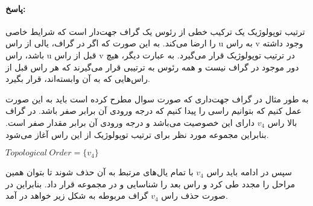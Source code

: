 \documentclass[a4paper,10pt]{article}
\begin{document}
    \begin{center}
        

    \end{center}

    \paragraph{پاسخ:} ترتیب توپولوژیک یک ترکیب خطی از رئوس یک گراف جهت‌دار است که شرایط خاصی را ارضا می‌کند. به این صورت که اگر در گراف، یالی از راس u به راس v وجود داشته باشد، راس u قبل از راس v در ترتیب توپولوژیک قرار می‌گیرد. به عبارت دیگر، هیچ دور موجود در گراف نیست و همه رئوس به ترتیبی قرار می‌گیرند که هر راس قبل از راس‌هایی که به آن وابسته‌اند، قرار بگیرد.

    به طور مثال در گراف جهت‌داری که صورت سوال مطرح کرده است باید به این صورت عمل کنیم که بتوانیم راسی را پیدا کنیم که درجه ورودی آن برابر صفر باشد. در گراف بالا راس $v_4$ دارای این خصوصیت می‌باشد و درجه ورودی آن برابر مقدار صفر است. بنابراین مجموعه مورد نظر برای ترتیب توپولوژیک از این راس آغاز می‌شود.

    \begin{center}
        
        $Topological \hspace{3pt} Order = \{v_4\}$

    \end{center}

    سپس در ادامه باید راس $v_4$ با تمام یال‌های مرتبط به آن حذف شوند تا بتوان همین مراحل را مجدد طی کرد و راس بعد را شناسایی و در مجموعه قرار داد. بنابراین در صورت حذف راس $v_4$ گراف مربوطه به شکل زیر خواهد در آمد.
\end{document}
